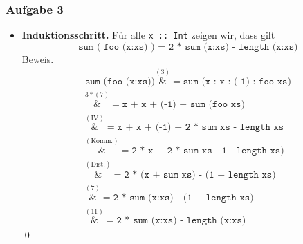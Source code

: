 \documentclass[aspectratio=1610,onlymath, ngerman]{beamer}
\renewcommand{\emph}[1]{\textbf{#1}}
\newcommand{\cw}[1]{\texttt{#1}}
\newcommand*{\astep}[2][]{\ensuremath{\overset{{#1} (\text{#2})}&{=}}}
\begin{document}
\begin{frame} \frametitle{Aufgabe 3}
	\begin{itemize}
		\item \emph{Induktionsschritt.} \quad Für alle \cw{x :: Int} zeigen wir, dass gilt
		\begin{equation*}
		\cw{sum ( foo (x:xs) ) = 2 * sum (x:xs) - length (x:xs)}
		\end{equation*}
		\underline{Beweis.} \vspace{-0.75\baselineskip}
		\begin{align*}
			\cw{sum (foo (x:xs))} \astep{3} \cw{sum (x : x : (-1) : foo xs)} \\
			\astep[3*]{7} \cw{x + x + (-1) + sum (foo xs)} \\
			\astep{IV} \cw{x + x + (-1) + 2 * sum xs - length xs} \\
			\astep{Komm.} \cw{2 * x + 2 * sum xs - 1 - length xs)} \\
			\astep{Dist.} \cw{2 * (x + sum xs) - (1 + length xs)} \\
			\astep{7} \cw{2 * sum (x:xs) - (1 + length xs)} \\
			\astep{11} \cw{2 * sum (x:xs) - length (x:xs)} 
		\end{align*}
		\vspace{-3\baselineskip}\flushright\qed
	\end{itemize}
\end{frame}
\end{document}
